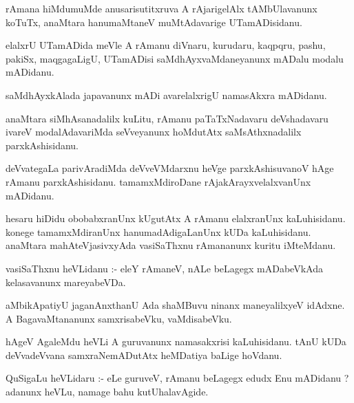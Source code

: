 \documentclass{article}
\begin{document}
\begin{mn}
rAmana  hiMdumuMde  anusarisutitxruva  A  rAjarigelAlx  tAMbUlavanunx  koTuTx,  anaMtara  hanumaMtaneV  muMtAdavarige  UTamADisidanu. 
\end{mn}

\begin{mn}
elalxrU  UTamADida  meVle  A  rAmanu  diVnaru,  kurudaru,  kaqpqru,  pashu,  pakiSx,  maqgagaLigU,  UTamADisi  saMdhAyxvaMdaneyanunx  mADalu  
modalu  mADidanu.
\end{mn}

\begin{mn}
saMdhAyxkAlada  japavanunx  mADi  avarelalxrigU  namasAkxra  mADidanu.
\end{mn}

\begin{mn}
anaMtara  siMhAsanadalilx  kuLitu,  rAmanu  paTaTxNadavaru  deVshadavaru  ivareV  modalAdavariMda  seVveyanunx  hoMdutAtx  saMsAthxnadalilx  parxkAshisidanu.
\end{mn}

\begin{mn}
deVvategaLa  parivAradiMda  deVveVMdarxnu  heVge  parxkAshisuvanoV  hAge  rAmanu  parxkAshisidanu.  tamamxMdiroDane  rAjakArayxvelalxvanUnx  mADidanu.
\end{mn}

\begin{mn}
hesaru  hiDidu  obobabxranUnx  kUgutAtx  A  rAmanu  elalxranUnx  kaLuhisidanu.  konege  tamamxMdiranUnx  hanumadAdigaLanUnx  kUDa  kaLuhisidanu.  
anaMtara  mahAteVjasivxyAda  vasiSaThxnu  rAmananunx  kuritu  iMteMdanu.
\end{mn}

\begin{mn}
vasiSaThxnu  heVLidanu :- eleY  rAmaneV,  nALe  beLagegx  mADabeVkAda  kelasavanunx  mareyabeVDa.
\end{mn}

\begin{mn}
aMbikApatiyU  jaganAnxthanU  Ada  shaMBuvu  ninanx  maneyalilxyeV  idAdxne.  A  BagavaMtananunx  samxrisabeVku,  vaMdisabeVku.
\end{mn}

\begin{mn}
hAgeV  AgaleMdu  heVLi  A  guruvanunx  namasakxrisi  kaLuhisidanu.  tAnU  kUDa  deVvadeVvana  samxraNemADutAtx  heMDatiya  baLige  hoVdanu.
\end{mn}

\begin{mn}
QuSigaLu  heVLidaru :- eLe  guruveV,  rAmanu  beLagegx  edudx  Enu  mADidanu ?  adanunx  heVLu,  namage  bahu  kutUhalavAgide.
\end{mn}
\end{document}
